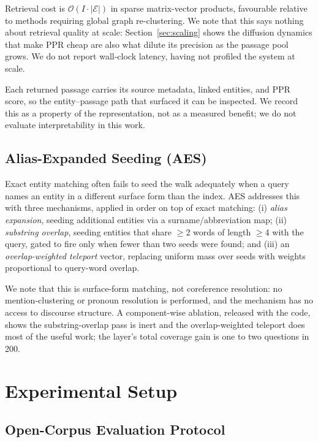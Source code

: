 \documentclass[runningheads]{llncs}
\begin{document}
Retrieval cost is $\mathcal{O}(I \cdot |\mathcal{E}|)$ in sparse matrix-vector products, favourable relative to methods requiring global graph re-clustering. We note that this says nothing about retrieval quality at scale: Section~\ref{sec:scaling} shows the diffusion dynamics that make PPR cheap are also what dilute its precision as the passage pool grows. We do not report wall-clock latency, having not profiled the system at scale.

Each returned passage carries its source metadata, linked entities, and PPR score, so the entity--passage path that surfaced it can be inspected. We record this as a property of the representation, not as a measured benefit; we do not evaluate interpretability in this work.



\subsection{Alias-Expanded Seeding (AES)}
\label{sec:aes}

Exact entity matching often fails to seed the walk adequately when a query names an entity in a different surface form than the index. AES addresses this with three mechanisms, applied in order on top of exact matching: (i) \emph{alias expansion}, seeding additional entities via a surname/abbreviation map; (ii) \emph{substring overlap}, seeding entities that share $\ge$2 words of length $\ge$4 with the query, gated to fire only when fewer than two seeds were found; and (iii) an \emph{overlap-weighted teleport} vector, replacing uniform mass over seeds with weights proportional to query-word overlap.

We note that this is surface-form matching, not coreference resolution: no mention-clustering or pronoun resolution is performed, and the mechanism has no access to discourse structure. A component-wise ablation, released with the code, shows the substring-overlap pass is inert and the overlap-weighted teleport does most of the useful work; the layer's total coverage gain is one to two questions in 200.

\section{Experimental Setup}

\subsection{Open-Corpus Evaluation Protocol}
\end{document}
